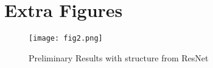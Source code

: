 \documentclass{article}
\begin{document}
\newpage 
\appendix

\section{Extra Figures}

\begin{figure}[H]
    \centering
    \texttt{[image: fig2.png]}
    \caption{Preliminary Results with structure from ResNet}
    \label{fig:prelim_results_2}
\end{figure}

\medskip


\small




\end{document}
